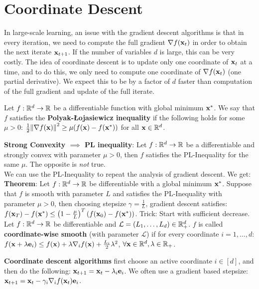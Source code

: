 \section{Coordinate Descent}
In large-scale learning, an issue with the gradient descent algorithms is that in every iteration, we need to compute the full gradient $\nabla f(\mathbf{x}_t)$ in order to obtain the next iterate $\mathbf{x}_{t+1}$. If the number of variables $d$ is large, this can be very costly. The idea of coordinate descent is to update only one coordinate of $\mathbf{x}_t$ at a time, and to do this, we only need to compute one coordinate of $\nabla f(\mathbf{x}_t)$ (one partial derivative). We expect this to be by a factor of $d$ faster than computation of the full gradient and update of the full iterate.

\begin{framed}
    Let $f : \mathbb{R}^d \rightarrow \mathbb{R}$ be a differentiable function with global minimum $\mathbf{x}^*$. We say that $f$ satisfies the \textbf{Polyak-Łojasiewicz inequality} if the following holds for some $\mu > 0$: $\frac{1}{2}\norm{\nabla f(\mathbf{x})}^2 \geq \mu (f(\mathbf{x}) - f(\mathbf{x}^*))$ for all $\mathbf{x} \in \mathbb{R}^d$.
\end{framed}
\textbf{Strong Convexity $\implies$ PL inequality}: Let $f : \mathbb{R}^d \rightarrow \mathbb{R}$ be a differentiable and strongly convex with parameter $\mu > 0$, then $f$ satisfies the PL-Inequality for the same $\mu$. The opposite is \textit{not} true. \\
We can use the PL-Inequality to repeat the analysis of gradient descent. We get: \\
\textbf{Theorem}: Let $f : \mathbb{R}^d \rightarrow \mathbb{R}$ be differentiable with a global minimum $\mathbf{x}^*$. Suppose that $f$ is smooth with parameter $L$ and satisfies the PL-Inequality with parameter $\mu > 0$, then choosing stepsize $\gamma = \frac{1}{L}$, gradient descent satisfies: $f(\mathbf{x}_T) - f(\mathbf{x}^*) \leq \left(1 - \frac{\mu}{L}\right)^T(f(\mathbf{x}_0)- f(\mathbf{x}^*))$. Trick: Start with sufficient decrease.  \\
Let $f : \mathbb{R}^d \rightarrow \mathbb{R}$ be differentiable and $\mathcal{L} = (L_1, \dots, L_d) \in \mathbb{R}^d_{+}$. $f$ is called \textbf{coordinate-wise smooth} (with parameter $\mathcal{L}$) if for every coordinate $i=1, \dots, d$: $f(\mathbf{x} + \lambda \mathbf{e}_i) \leq f(\mathbf{x}) + \lambda \nabla_i f(\mathbf{x}) + \frac{L_i}{2}\lambda^2$, $\forall \mathbf{x} \in \mathbb{R}^d, \lambda \in \mathbb{R}_{+}$. \\
\begin{framed}
    \textbf{Coordinate descent algorithms} first choose an active coordinate $i \in [d]$, and then do the following: $\mathbf{x}_{t+1} = \mathbf{x}_t - \lambda_i \mathbf{e}_i$. We often use a gradient based stepsize: $\mathbf{x}_{t+1} = \mathbf{x}_t - \gamma_i \nabla_i f(\mathbf{x}_t) \mathbf{e}_i$.
\end{framed}
